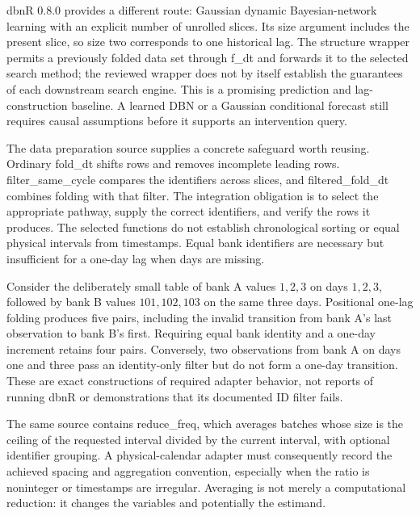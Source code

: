 dbnR 0.8.0 provides a different route: Gaussian dynamic Bayesian-network learning
with an explicit number of unrolled slices. Its size argument includes the
present slice, so size two corresponds to one historical lag. The structure
wrapper permits a previously folded data set through f\_dt and forwards it to
the selected search method; the reviewed wrapper does not by itself establish
the guarantees of each downstream search engine. This is a promising prediction
and lag-construction baseline. A learned DBN or a Gaussian conditional forecast
still requires causal assumptions before it supports an intervention query.
\citep{exec14_rtime_dbnr}

The data preparation source supplies a concrete safeguard worth reusing.
Ordinary fold\_dt shifts rows and removes incomplete leading rows.
filter\_same\_cycle compares the identifiers across slices, and
filtered\_fold\_dt combines folding with that filter. The integration obligation
is to select the appropriate pathway, supply the correct identifiers, and verify
the rows it produces. The selected functions do not establish chronological
sorting or equal physical intervals from timestamps. Equal bank identifiers
are necessary but insufficient for a one-day lag when days are missing.
\citep{exec14_rtime_dbnr}

Consider the deliberately small table of bank A values \(1,2,3\) on days
\(1,2,3\), followed by bank B values \(101,102,103\) on the same three days.
Positional one-lag folding produces five pairs, including the invalid transition
from bank A's last observation to bank B's first. Requiring equal bank identity
and a one-day increment retains four pairs. Conversely, two observations from
bank A on days one and three pass an identity-only filter but do not form a
one-day transition. These are exact constructions of required adapter behavior,
not reports of running dbnR or demonstrations that its documented ID filter
fails. \citep{exec14_rtime_exact}

The same source contains reduce\_freq, which averages batches whose size is
the ceiling of the requested interval divided by the current interval, with
optional identifier grouping. A physical-calendar adapter must consequently
record the achieved spacing and aggregation convention, especially when the
ratio is noninteger or timestamps are irregular. Averaging is not merely a
computational reduction: it changes the variables and potentially the estimand.
\citep{exec14_rtime_dbnr}

